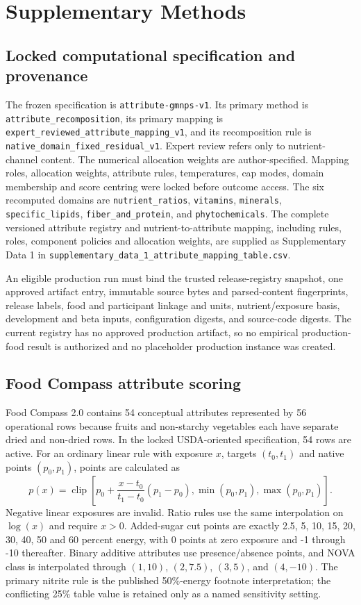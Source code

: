 \section{Supplementary Methods}

\subsection*{Locked computational specification and provenance}

The frozen specification is \texttt{attribute-gmnps-v1}. Its primary method is
\texttt{attribute\_recomposition}, its primary mapping is
\texttt{expert\_reviewed\_attribute\_mapping\_v1}, and its recomposition rule is
\texttt{native\_domain\_fixed\_residual\_v1}. Expert review refers only to
nutrient-channel content. The numerical allocation weights are author-specified.
Mapping roles, allocation weights,
attribute rules, temperatures, cap modes, domain membership and score centring
were locked before outcome access. The six recomputed domains are
\texttt{nutrient\_ratios}, \texttt{vitamins}, \texttt{minerals},
\texttt{specific\_lipids}, \texttt{fiber\_and\_protein}, and
\texttt{phytochemicals}. The complete versioned attribute registry and
nutrient-to-attribute mapping, including rules, roles, component policies and
allocation weights, are supplied as Supplementary Data 1 in
\texttt{supplementary\_data\_1\_attribute\_mapping\_table.csv}.

An eligible production run must bind the trusted release-registry snapshot, one approved artifact entry, immutable source bytes and parsed-content fingerprints, release labels, food and participant linkage and units, nutrient/exposure basis, development and beta inputs, configuration digests, and source-code digests. The current registry has no approved production
artifact, so no empirical production-food result is authorized and no
placeholder production instance was created.

\subsection*{Food Compass attribute scoring}

Food Compass 2.0 contains 54 conceptual attributes represented by 56
operational rows because fruits and non-starchy vegetables each have separate
dried and non-dried rows. In the locked USDA-oriented specification, 54 rows
are active. For an ordinary linear rule with exposure \(x\), targets
\((t_0,t_1)\) and native points \((p_0,p_1)\), points are calculated as
\[
p(x)=\operatorname{clip}\!\left[
p_0+\frac{x-t_0}{t_1-t_0}(p_1-p_0),
\min(p_0,p_1),\max(p_0,p_1)\right].
\]
Negative linear exposures are invalid. Ratio rules use the same interpolation
on \(\log(x)\) and require \(x>0\). Added-sugar cut points are exactly 2.5, 5,
10, 15, 20, 30, 40, 50 and 60 percent energy, with 0 points at zero exposure
and -1 through -10 thereafter. Binary additive attributes use presence/absence
points, and NOVA class is interpolated through \((1,10)\), \((2,7.5)\),
\((3,5)\), and \((4,-10)\). The primary nitrite rule is the published
50\%-energy footnote interpretation; the conflicting 25\% table value is
retained only as a named sensitivity setting.

